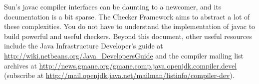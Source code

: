 Sun's javac compiler interfaces can be daunting to a
newcomer, and its documentation is a bit sparse. The Checker Framework
aims to abstract a lot of these complexities.
You do not have to understand the implementation of javac to
build powerful and useful checkers.
Beyond this document, 
other useful resources include the Java Infrastructure
Developer's guide at
\url{http://wiki.netbeans.org/Java_DevelopersGuide} and the compiler
mailing list archives at
\url{http://news.gmane.org/gmane.comp.java.openjdk.compiler.devel}
(subscribe at
\url{http://mail.openjdk.java.net/mailman/listinfo/compiler-dev}).



